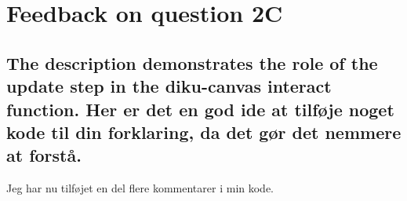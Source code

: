 \documentclass[a4paper,12pt]{article}
\begin{document}
\section{Feedback on question 2C}

\subsection{The description demonstrates the role of the update step in the diku-canvas interact function. Her er det en god ide at tilføje noget kode til din forklaring, da det gør det nemmere at forstå.}
Jeg har nu tilføjet en del flere kommentarer i min kode.
\end{document}
